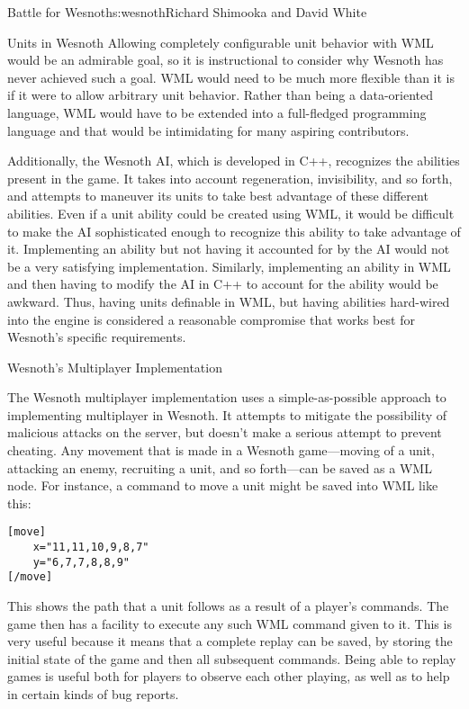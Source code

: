 \begin{aosachapter}{Battle for Wesnoth}{s:wesnoth}{Richard Shimooka and David White}
\begin{aosasect1}{Units in Wesnoth}
Allowing completely configurable unit behavior with WML would be an
admirable goal, so it is instructional to consider why Wesnoth has
never achieved such a goal.  WML would need to be much more flexible
than it is if it were to allow arbitrary unit behavior. Rather than
being a data-oriented language, WML would have to be extended into a
full-fledged programming language and that would be intimidating for
many aspiring contributors.

Additionally, the Wesnoth AI, which is developed in C++, recognizes
the abilities present in the game. It takes into account regeneration,
invisibility, and so forth, and attempts to maneuver its units to take
best advantage of these different abilities. Even if a unit ability
could be created using WML, it would be difficult to make the AI
sophisticated enough to recognize this ability to take advantage of
it.  Implementing an ability but not having it accounted for by the AI
would not be a very satisfying implementation.  Similarly,
implementing an ability in WML and then having to modify the AI in C++
to account for the ability would be awkward. Thus, having units
definable in WML, but having abilities hard-wired into the engine is
considered a reasonable compromise that works best for Wesnoth's
specific requirements.

\end{aosasect1}

\begin{aosasect1}{Wesnoth's Multiplayer Implementation}

The Wesnoth multiplayer implementation uses a simple-as-possible
approach to implementing multiplayer in Wesnoth. It attempts to
mitigate the possibility of malicious attacks on the server, but
doesn't make a serious attempt to prevent cheating.  Any movement that
is made in a Wesnoth game---moving of a unit, attacking an enemy,
recruiting a unit, and so forth---can be saved as a WML node. For
instance, a command to move a unit might be saved into WML like this:

\begin{verbatim}
[move]
    x="11,11,10,9,8,7"
    y="6,7,7,8,8,9"
[/move]
\end{verbatim}

\noindent This shows the path that a unit follows as a result of a player's
commands. The game then has a facility to execute any such WML command
given to it. This is very useful because it means that a complete
replay can be saved, by storing the initial state of the game and then
all subsequent commands. Being able to replay games is useful both for
players to observe each other playing, as well as to help in certain
kinds of bug reports.


\end{aosasect1}
\end{aosachapter}

